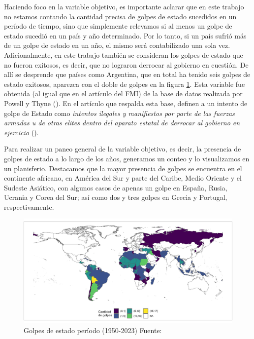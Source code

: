 \documentclass{article}
\begin{document}
Haciendo foco en la variable objetivo, es importante aclarar que en este trabajo no 
estamos contando la cantidad precisa
de golpes de estado sucedidos en un período de tiempo, sino que simplemente relevamos
si al menos un golpe de estado sucedió en un país y año determinado. Por lo tanto, si
un país sufrió más de un golpe de estado en un año, el mismo será contabilizado una
sola vez. Adicionalmente, en este trabajo también se consideran los golpes de estado
que no fueron exitosos, es decir, que no lograron derrocar al gobierno en cuestión. 
De allí se desprende que países como Argentina, que en total ha tenido seis golpes de 
estado exitosos, aparezca con el doble de golpes en la figura \ref{fig::mapa_golpes}.
Esta variable fue obtenida (al igual que en el artículo del FMI) de la base de datos
realizada por Powell y Thyne (\citeyear{Pow11}). En el artículo que respalda esta base, 
definen a un intento de golpe de Estado como \textit{intentos ilegales y manifiestos por parte 
de las fuerzas armadas u de otras elites dentro del aparato estatal de derrocar al 
gobierno en ejercicio} (\cite[p.~252]{Pow11}).

Para realizar un paneo general de la variable objetivo, es decir, la presencia de
golpes de estado a lo largo de los años, generamos un conteo y lo visualizamos en un 
planisferio. Destacamos que la mayor presencia de golpes se encuentra en el 
continente africano, en América del Sur y parte del Caribe, Medio Oriente y el 
Sudeste Asiático, con algunos casos de apenas un golpe en España, Rusia, Ucrania 
y Corea del Sur; así como dos y tres golpes en Grecia y Portugal, respectivamente.

\begin{figure}[H]
  \centering  
  \includegraphics[width=1\textwidth]{2_golpes.png}
  \caption{Golpes de estado período (1950-2023) Fuente: \cite{Pow11} \label{fig::mapa_golpes}}
\end{figure}
\end{document}
